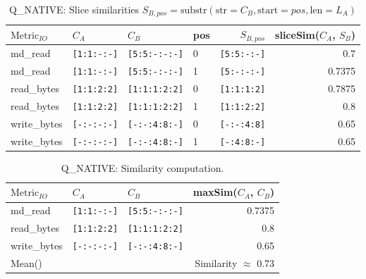 \documentclass{jhps}
\begin{document}
\begin{table}[t]
\centering
\begin{tabular}{llllrr}
  $\text{Metric}_{IO}$ & $C_A$                 & $C_B$                   & pos & $S_{B,pos}$           & sliceSim($C_A$, $S_B$) \\ 
  \midrule
  md\_read             & \lstinline|[1:1:-:-]| & \lstinline|[5:5:-:-:-]| & 0   & \lstinline|[5:5:-:-]| & 0.7                    \\ 
  md\_read             & \lstinline|[1:1:-:-]| & \lstinline|[5:5:-:-:-]| & 1   & \lstinline|[5:-:-:-]| & 0.7375                 \\ 
  read\_bytes          & \lstinline|[1:1:2:2]| & \lstinline|[1:1:1:2:2]| & 0   & \lstinline|[1:1:1:2]| & 0.7875                 \\ 
  read\_bytes          & \lstinline|[1:1:2:2]| & \lstinline|[1:1:1:2:2]| & 1   & \lstinline|[1:1:2:2]| & 0.8                    \\ 
  write\_bytes         & \lstinline|[-:-:-:-]| & \lstinline|[-:-:4:8:-]| & 0   & \lstinline|[-:-:4:8]| & 0.65                   \\ 
  write\_bytes         & \lstinline|[-:-:-:-]| & \lstinline|[-:-:4:8:-]| & 1   & \lstinline|[-:4:8:-]| & 0.65                   \\ 
\end{tabular}
\caption{Q\_NATIVE: Slice similarities $S_{B,pos} = \text{substr}(\text{str}=C_B, \text{start}=pos, \text{len}=L_A)$}
\label{tab:hex_native:compute_slice_sim}
\end{table}

\begin{table}[t]
\centering
\begin{tabular}{lllr}
  $\text{Metric}_{IO}$ & $C_A$                 & $C_B$                   &  maxSim($C_A$, $C_B$) \\ 
  \midrule
  md\_read             & \lstinline|[1:1:-:-]| & \lstinline|[5:5:-:-:-]| &  0.7375               \\ 
  read\_bytes          & \lstinline|[1:1:2:2]| & \lstinline|[1:1:1:2:2]| &  0.8                  \\ 
  write\_bytes         & \lstinline|[-:-:-:-]| & \lstinline|[-:-:4:8:-]| &  0.65                 \\ 
  \midrule
  Mean()  &                       &                         &  Similarity $\approx$ 0.73        \\ 
\end{tabular}
\caption{Q\_NATIVE: Similarity computation.}
\label{tab:hex_native:compute_sim}
\end{table}
\end{document}
